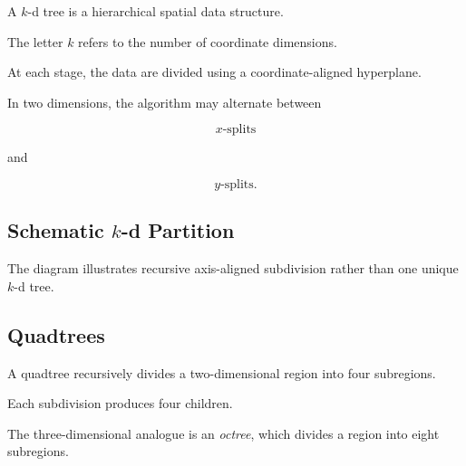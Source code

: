 A \(k\)-d tree is a hierarchical spatial data structure.

The letter \(k\) refers to the number of coordinate dimensions.

At each stage, the data are divided using a coordinate-aligned hyperplane.

In two dimensions, the algorithm may alternate between

\[
\boxed{x\text{-splits}}
\]

and

\[
\boxed{y\text{-splits}}.
\]

\subsection{Schematic \texorpdfstring{\(k\)-d}{k-d} Partition}
\label{subsec:kd-partition}

\begin{centereddiagram}
\end{centereddiagram}

The diagram illustrates recursive axis-aligned subdivision rather than one
unique \(k\)-d tree.

\subsection{Quadtrees}
\label{subsec:quadtrees}

A quadtree recursively divides a two-dimensional region into four
subregions.

Each subdivision produces four children.

The three-dimensional analogue is an \emph{octree}, which divides a region
into eight subregions.

